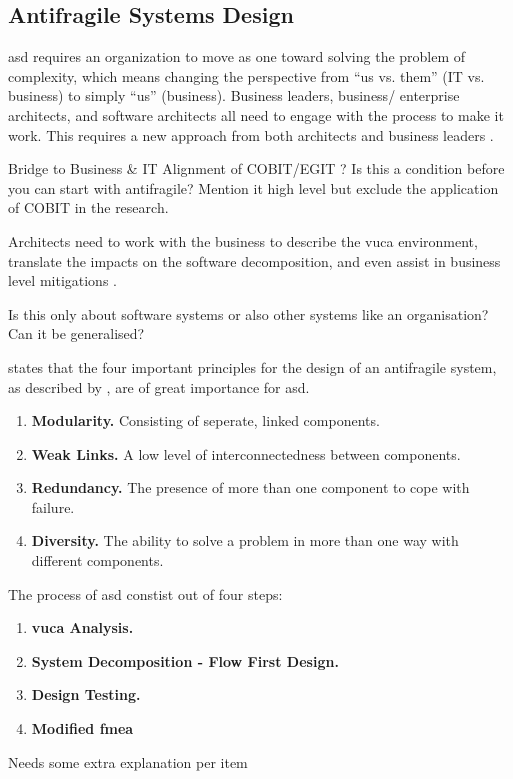 \subsection{Antifragile Systems Design}
\label{sub:sfasd}

\acrfull{asd} \parencite[p. 886-888]{OReilly2019} requires an organization to move as one toward solving the problem of complexity, which means changing the perspective from “us vs. them” (IT vs. business) to simply “us” (business). Business leaders, business/ enterprise architects, and software architects all need to engage with the process to make it work. This requires a new approach from both architects and business leaders \parencite[p. 886]{OReilly2019}.

\begin{remark}
	Bridge to Business \& IT Alignment of COBIT/EGIT \parencite{DeHaes2020}? Is this a condition before you can start with antifragile? Mention it high level but exclude the application of COBIT in the research.
\end{remark}

Architects need to work with the business to describe the \acrshort{vuca} environment, translate the impacts on the
software decomposition, and even assist in business level mitigations \parencite[p. 886]{OReilly2019}.

\begin{remark}
	Is this only about software systems or also other systems like an organisation? Can it be generalised?
\end{remark}

\textcite[p. 886]{OReilly2019} states that the four important principles for the design of an \gls{antifragile} system, as described by \textcite[p. 35-39]{Hole2016}, are of great importance for \acrshort{asd}.
\begin{enumerate}
	\item{\textbf{Modularity.} Consisting of seperate, linked components.}
	\item{\textbf{Weak Links.} A low level of interconnectedness between components.}
	\item{\textbf{Redundancy.} The presence of more than one component to cope with failure.}
	\item{\textbf{Diversity.} The ability to solve a problem in more than one way with different components.}
\end{enumerate}

The process of \acrshort{asd} constist out of four steps:
\begin{enumerate}
	\item{\textbf{\acrshort{vuca} Analysis.}}
	\item{\textbf{System Decomposition - Flow First Design.}}
	\item{\textbf{Design Testing.}}
	\item{\textbf{Modified \acrfull{fmea}}}
\end{enumerate}
\begin{remark}
	Needs some extra explanation per item
\end{remark}

